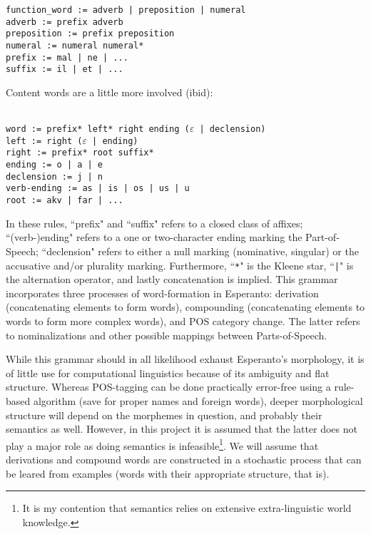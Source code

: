 \documentclass[10pt,a4paper]{article}
\begin{document}
\begin{verbatim}
function_word := adverb | preposition | numeral
adverb := prefix adverb
preposition := prefix preposition
numeral := numeral numeral*
prefix := mal | ne | ...
suffix := il | et | ...
\end{verbatim}

Content words are a little more involved (ibid):

\noindent
\texttt{  \\
word := prefix* left* right ending ($\varepsilon$ | declension) \\
left := right ($\mathtt\varepsilon$ | ending) \\
right := prefix* root suffix* \\
ending := o | a | e \\
declension := j | n \\
verb-ending := as | is | os | us | u \\
root := akv | far | ...
}

In these rules, ``prefix" and ``suffix" refers to a closed class of affixes;
``(verb-)ending" refers to a one or two-character ending marking the
Part-of-Speech; ``declension" refers to either a null marking (nominative,
singular) or the accusative and/or plurality marking. Furthermore,
``\texttt{*}" is the Kleene star, ``\texttt{|}" is the alternation operator,
and lastly concatenation is implied. This grammar incorporates three processes
of word-formation in Esperanto: derivation (concatenating elements to form
words), compounding (concatenating elements to words to form more complex
words), and POS category change.  The latter refers to nominalizations and
other possible mappings between Parts-of-Speech.

While this grammar should in all likelihood exhaust Esperanto's morphology, 
it is of little use for computational linguistics because of its ambiguity
and flat structure.  Whereas POS-tagging can be done practically error-free
using a rule-based algorithm (save for proper names and foreign words), deeper
morphological structure will depend on the morphemes in question, and probably
their semantics as well. However, in this project it is assumed that the latter
does not play a major role as doing semantics is infeasible\footnote{It is my
contention that semantics relies on extensive extra-linguistic world
knowledge.}. We will assume that derivations and compound words are constructed
in a stochastic process that can be leared from examples (words with their
appropriate structure, that is).
\end{document}
